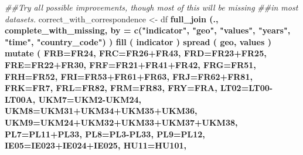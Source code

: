\documentclass[]{article}
\newenvironment{Shaded}{\begin{snugshade}}{\end{snugshade}}
\newcommand{\CommentTok}[1]{\textcolor[rgb]{0.56,0.35,0.01}{\textit{#1}}}
\newcommand{\DataTypeTok}[1]{\textcolor[rgb]{0.13,0.29,0.53}{#1}}
\newcommand{\KeywordTok}[1]{\textcolor[rgb]{0.13,0.29,0.53}{\textbf{#1}}}
\newcommand{\NormalTok}[1]{#1}
\newcommand{\OperatorTok}[1]{\textcolor[rgb]{0.81,0.36,0.00}{\textbf{#1}}}
\newcommand{\StringTok}[1]{\textcolor[rgb]{0.31,0.60,0.02}{#1}}
\begin{document}
\begin{Shaded}
\begin{Highlighting}[]
{{{{{{{{{{{{{{{{{{{{{{{{{{{{{{{{{{{{{{{{{{{{{{{{{{{{{{    \CommentTok{##Try all possible improvements, though most of this will be missing}
    \CommentTok{##in most datasets. }
\NormalTok{    correct_with_correspondence <-}\StringTok{ }\NormalTok{df }\OperatorTok{%>%}
\StringTok{      }\KeywordTok{full_join}\NormalTok{ (., complete_with_missing, }
                 \DataTypeTok{by =} \KeywordTok{c}\NormalTok{(}\StringTok{"indicator"}\NormalTok{, }\StringTok{"geo"}\NormalTok{, }\StringTok{"values"}\NormalTok{, }\StringTok{"years"}\NormalTok{,}
                        \StringTok{"time"}\NormalTok{, }\StringTok{"country_code"}\NormalTok{) ) }\OperatorTok{%>%}
\StringTok{      }\KeywordTok{fill}\NormalTok{ ( indicator )  }\OperatorTok{%>%}
\StringTok{      }\KeywordTok{spread}\NormalTok{ ( geo, values  ) }\OperatorTok{%>%}
\StringTok{      }\KeywordTok{mutate}\NormalTok{ ( }\DataTypeTok{FRB=}\NormalTok{FR24,}
               \DataTypeTok{FRC=}\NormalTok{FR26}\OperatorTok{+}\NormalTok{FR43,}
               \DataTypeTok{FRD=}\NormalTok{FR23}\OperatorTok{+}\NormalTok{FR25,}
               \DataTypeTok{FRE=}\NormalTok{FR22}\OperatorTok{+}\NormalTok{FR30,}
               \DataTypeTok{FRF=}\NormalTok{FR21}\OperatorTok{+}\NormalTok{FR41}\OperatorTok{+}\NormalTok{FR42,}
               \DataTypeTok{FRG=}\NormalTok{FR51,}
               \DataTypeTok{FRH=}\NormalTok{FR52,}
               \DataTypeTok{FRI=}\NormalTok{FR53}\OperatorTok{+}\NormalTok{FR61}\OperatorTok{+}\NormalTok{FR63,}
               \DataTypeTok{FRJ=}\NormalTok{FR62}\OperatorTok{+}\NormalTok{FR81,}
               \DataTypeTok{FRK=}\NormalTok{FR7,}
               \DataTypeTok{FRL=}\NormalTok{FR82,}
               \DataTypeTok{FRM=}\NormalTok{FR83,}
               \DataTypeTok{FRY=}\NormalTok{FRA, }
               \DataTypeTok{LT02=}\NormalTok{LT00}\OperatorTok{-}\NormalTok{LT00A,}
               \DataTypeTok{UKM7=}\NormalTok{UKM2}\OperatorTok{-}\NormalTok{UKM24,}
               \DataTypeTok{UKM8=}\NormalTok{UKM31}\OperatorTok{+}\NormalTok{UKM34}\OperatorTok{+}\NormalTok{UKM35}\OperatorTok{+}\NormalTok{UKM36,}
               \DataTypeTok{UKM9=}\NormalTok{UKM24}\OperatorTok{+}\NormalTok{UKM32}\OperatorTok{+}\NormalTok{UKM33}\OperatorTok{+}\NormalTok{UKM37}\OperatorTok{+}\NormalTok{UKM38, }
               \DataTypeTok{PL7=}\NormalTok{PL11}\OperatorTok{+}\NormalTok{PL33,}
               \DataTypeTok{PL8=}\NormalTok{PL3}\OperatorTok{-}\NormalTok{PL33,}
               \DataTypeTok{PL9=}\NormalTok{PL12,}
               \DataTypeTok{IE05=}\NormalTok{IE023}\OperatorTok{+}\NormalTok{IE024}\OperatorTok{+}\NormalTok{IE025,}
               \DataTypeTok{HU11=}\NormalTok{HU101,}
}}}}}}}}}}}}}}}}}}}}}}}}}}}}}}}}}}}}}}}}}}}}}}}}}}}}}}}}}}
\end{Highlighting}
\end{Shaded}
\end{document}
